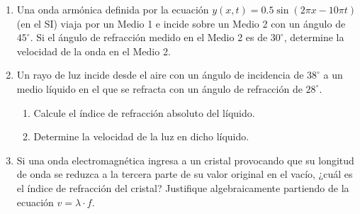 \documentclass[11pt, letterpaper]{article}
\newif\ifmostrarrespuestas
\newcommand{\respuesta}[1]{
	\ifmostrarrespuestas
	\par\vspace{0.2cm}
	\textbf{\textcolor{blue}{Solución:}} \textcolor{blue}{#1}
	\vspace{0.4cm}
	\else
	\fi
}
\begin{document}
\begin{enumerate}[leftmargin=*, itemsep=0.8cm]
		\item Una onda armónica definida por la ecuación $y(x,t) = 0.5 \sin(2\pi x - 10\pi t)$ (en el SI) viaja por un Medio 1 e incide sobre un Medio 2 con un ángulo de $45^\circ$. Si el ángulo de refracción medido en el Medio 2 es de $30^\circ$, determine la velocidad de la onda en el Medio 2.
		\respuesta{
			Primero extraemos la velocidad del Medio 1: $\omega = 10\pi$, $k = 2\pi \implies v_1 = \frac{\omega}{k} = \frac{10\pi}{2\pi} = 5 \text{ m/s}$.\\
			Usamos la Ley de Snell en términos de velocidades: $\frac{\sin(\theta_1)}{v_1} = \frac{\sin(\theta_2)}{v_2}$.\\
			$\frac{\sin(45^\circ)}{5} = \frac{\sin(30^\circ)}{v_2} \implies \frac{0.707}{5} = \frac{0.5}{v_2} \implies v_2 = \frac{5 \cdot 0.5}{0.707} \approx 3.53 \text{ m/s}$.
		}
		
		\item Un rayo de luz incide desde el aire con un ángulo de incidencia de $38^\circ$ a un medio líquido en el que se refracta con un ángulo de refracción de $28^\circ$.
		\begin{enumerate}[label=\alph*., itemsep=0.2cm]
			\item Calcule el índice de refracción absoluto del líquido.
			\item Determine la velocidad de la luz en dicho líquido.
		\end{enumerate}
		\respuesta{
			a) $n_1 \sin(\theta_1) = n_2 \sin(\theta_2) \implies 1 \cdot \sin(38^\circ) = n_2 \cdot \sin(28^\circ)$.\\
			$n_2 = \frac{\sin(38^\circ)}{\sin(28^\circ)} = \frac{0.615}{0.469} \approx 1.31$.\\
			b) $v = \frac{c}{n} = \frac{3 \times 10^8 \text{ m/s}}{1.31} \approx 2.29 \times 10^8 \text{ m/s}$.
		}
		
		\item Si una onda electromagnética ingresa a un cristal provocando que su longitud de onda se reduzca a la tercera parte de su valor original en el vacío, ¿cuál es el índice de refracción del cristal? Justifique algebraicamente partiendo de la ecuación $v = \lambda \cdot f$.
		\respuesta{
			En el vacío, la velocidad es $c = \lambda_0 \cdot f$. En el cristal, la frecuencia se mantiene ($f$), por lo que la nueva velocidad es $v = \lambda_2 \cdot f$.\\
			Como $\lambda_2 = \frac{\lambda_0}{3}$, tenemos que $v = \left(\frac{\lambda_0}{3}\right) f = \frac{\lambda_0 \cdot f}{3} = \frac{c}{3}$.\\
			El índice de refracción es la razón de velocidades: $n = \frac{c}{v} = \frac{c}{\frac{c}{3}} = 3$. El índice es 3.
		}
		

\end{enumerate}
\end{document}
